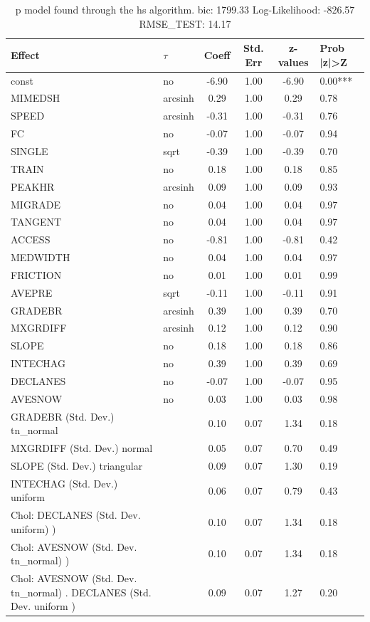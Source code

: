 \begin{table}
	\caption{p model found through the hs algorithm. bic: 1799.33 Log-Likelihood: -826.57 RMSE_TEST: 14.17}
	\begin{center}
		\begin{tabular}{|l|l|c|c|c|l|}
			\hline
			Effect & $\tau$ & Coeff & Std. Err & z-values & Prob |z|>Z \\
			\hline
			const & no & -6.90 & 1.00 & -6.90 & 0.00*** \\
			\hline
			MIMEDSH & arcsinh & 0.29 & 1.00 & 0.29 & 0.78 \\
			\hline
			SPEED & arcsinh & -0.31 & 1.00 & -0.31 & 0.76 \\
			\hline
			FC & no & -0.07 & 1.00 & -0.07 & 0.94 \\
			\hline
			SINGLE & sqrt & -0.39 & 1.00 & -0.39 & 0.70 \\
			\hline
			TRAIN & no & 0.18 & 1.00 & 0.18 & 0.85 \\
			\hline
			PEAKHR & arcsinh & 0.09 & 1.00 & 0.09 & 0.93 \\
			\hline
			MIGRADE & no & 0.04 & 1.00 & 0.04 & 0.97 \\
			\hline
			TANGENT & no & 0.04 & 1.00 & 0.04 & 0.97 \\
			\hline
			ACCESS & no & -0.81 & 1.00 & -0.81 & 0.42 \\
			\hline
			MEDWIDTH & no & 0.04 & 1.00 & 0.04 & 0.97 \\
			\hline
			FRICTION & no & 0.01 & 1.00 & 0.01 & 0.99 \\
			\hline
			AVEPRE & sqrt & -0.11 & 1.00 & -0.11 & 0.91 \\
			\hline
			GRADEBR & arcsinh & 0.39 & 1.00 & 0.39 & 0.70 \\
			\hline
			MXGRDIFF & arcsinh & 0.12 & 1.00 & 0.12 & 0.90 \\
			\hline
			SLOPE & no & 0.18 & 1.00 & 0.18 & 0.86 \\
			\hline
			INTECHAG & no & 0.39 & 1.00 & 0.39 & 0.69 \\
			\hline
			DECLANES & no & -0.07 & 1.00 & -0.07 & 0.95 \\
			\hline
			AVESNOW & no & 0.03 & 1.00 & 0.03 & 0.98 \\
			\hline
			GRADEBR (Std. Dev.) tn_normal &  & 0.10 & 0.07 & 1.34 & 0.18 \\
			\hline
			MXGRDIFF (Std. Dev.) normal &  & 0.05 & 0.07 & 0.70 & 0.49 \\
			\hline
			SLOPE (Std. Dev.) triangular &  & 0.09 & 0.07 & 1.30 & 0.19 \\
			\hline
			INTECHAG (Std. Dev.) uniform &  & 0.06 & 0.07 & 0.79 & 0.43 \\
			\hline
			 Chol: DECLANES (Std. Dev. uniform) ) &  & 0.10 & 0.07 & 1.34 & 0.18 \\
			\hline
			 Chol: AVESNOW (Std. Dev. tn_normal) ) &  & 0.10 & 0.07 & 1.34 & 0.18 \\
			\hline
			 Chol: AVESNOW (Std. Dev. tn_normal) . DECLANES (Std. Dev.   uniform ) &  & 0.09 & 0.07 & 1.27 & 0.20 \\
			\hline
		\end{tabular}
	\end{center}
\end{table}